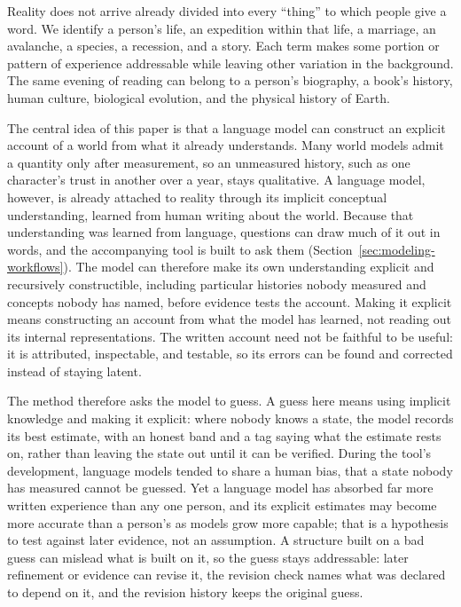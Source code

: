 \documentclass[11pt,a4paper]{article}
\begin{document}
Reality does not arrive already divided into every ``thing'' to which people
give a word. We identify a person's life, an expedition within that life, a
marriage, an avalanche, a species, a recession, and a story. Each term makes
some portion or pattern of experience addressable while leaving other
variation in the background. The same evening of reading can belong to a
person's biography, a book's history, human culture, biological evolution, and
the physical history of Earth.

The central idea of this paper is that a language model can construct an
explicit account of a world from what it already understands. Many world models
admit a quantity only after measurement, so an unmeasured history, such as one
character's trust in another over a year, stays qualitative. A language model,
however, is already attached to reality through its implicit conceptual
understanding, learned from human writing about the world. Because that
understanding was learned from language, questions can draw much of it out in
words, and the accompanying tool is built to ask them
(Section~\ref{sec:modeling-workflows}). The model can therefore make its own
understanding explicit and recursively constructible, including particular
histories nobody measured and concepts nobody has named, before evidence tests
the account. Making it explicit means constructing an account from what the
model has learned, not reading out its internal representations. The written
account need not be faithful to be useful: it is
attributed, inspectable, and testable, so its errors can be found and corrected
instead of staying latent.

The method therefore asks the model to guess. A guess here means using implicit
knowledge and making it explicit: where nobody knows a state, the model records
its best estimate, with an honest band and a tag saying what the estimate rests
on, rather than leaving the state out until it can be verified. During the
tool's development, language models tended to share a human bias, that a state
nobody has measured cannot be guessed. Yet a language model has absorbed far
more written experience than any one person, and its explicit estimates may
become more accurate than a person's as models grow more capable; that is a
hypothesis to test against later evidence, not an assumption. A structure built
on a bad guess can mislead what is built on it, so the guess stays addressable:
later refinement or evidence can revise it, the revision check names what was
declared to depend on it, and the revision history keeps the original guess.
\end{document}
